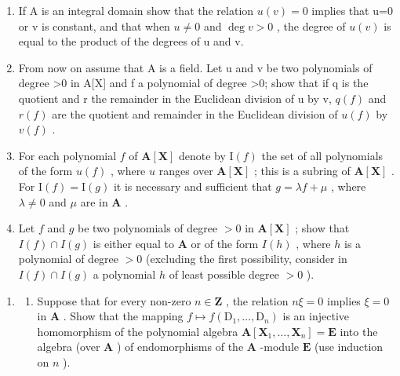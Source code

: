 \begin{enumerate}
\def\labelenumi{\alph{enumi})}
\setcounter{enumi}{1}
\item
  If A is an integral domain show that the relation \(u(v)=0\) implies that u=0 or v is constant, and that when \(u\neq0\) and \(\deg v>0\) , the degree of \(u(v)\) is equal to the product of the degrees of u and v.
\item
  From now on assume that A is a field. Let u and v be two polynomials of degree \textgreater0 in A{[}X{]} and f a polynomial of degree \textgreater0; show that if q is the quotient and r the remainder in the Euclidean division of u by v, \(q(f)\) and \(r(f)\) are the quotient and remainder in the Euclidean division of \(u(f)\) by \(v(f)\) .
\item
  For each polynomial \(f\) of \(\mathbf{A}[\mathbf{X}]\) denote by \(\mathrm{I}(f)\) the set of all polynomials of the form \(u(f)\) , where \(u\) ranges over \(\mathbf{A}[\mathbf{X}]\) ; this is a subring of \(\mathbf{A}[\mathbf{X}]\) . For \(\mathrm{I}(f) = \mathrm{I}(g)\) it is necessary and sufficient that \(g = \lambda f + \mu\) , where \(\lambda \neq 0\) and \(\mu\) are in \(\mathbf{A}\) .
\item
  Let \(f\) and \(g\) be two polynomials of degree \(> 0\) in \(\mathbf{A}[\mathbf{X}]\) ; show that \(I(f) \cap I(g)\) is either equal to \(\mathbf{A}\) or of the form \(I(h)\) , where \(h\) is a polynomial of degree \(> 0\) (excluding the first possibility, consider in \(I(f) \cap I(g)\) a polynomial \(h\) of least possible degree \(> 0\) ).
\end{enumerate}

\begin{enumerate}
\def\labelenumi{\arabic{enumi})}
\setcounter{enumi}{3}
\tightlist
\item
  \begin{enumerate}
  \def\labelenumii{\alph{enumii})}
  \tightlist
  \item
    Suppose that for every non-zero \(n \in \mathbf{Z}\) , the relation \(n\xi = 0\) implies \(\xi = 0\) in \(\mathbf{A}\) . Show that the mapping \(f \mapsto f(\mathrm{D}_1, \ldots, \mathrm{D}_n)\) is an injective homomorphism of the polynomial algebra \(\mathbf{A}[\mathbf{X}_1, \ldots, \mathbf{X}_n] = \mathbf{E}\) into the algebra (over \(\mathbf{A}\) ) of endomorphisms of the \(\mathbf{A}\) -module \(\mathbf{E}\) (use induction on \(n\) ).
  \end{enumerate}
\end{enumerate}

